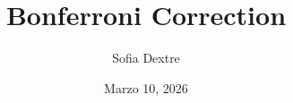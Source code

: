 \documentclass[12pt]{article} %
\theoremstyle{definition}
\begin{document}
\title{Bonferroni Correction}
\author{Sofia Dextre}
\date{Marzo 10, 2026}

\maketitle %






\end{document}
